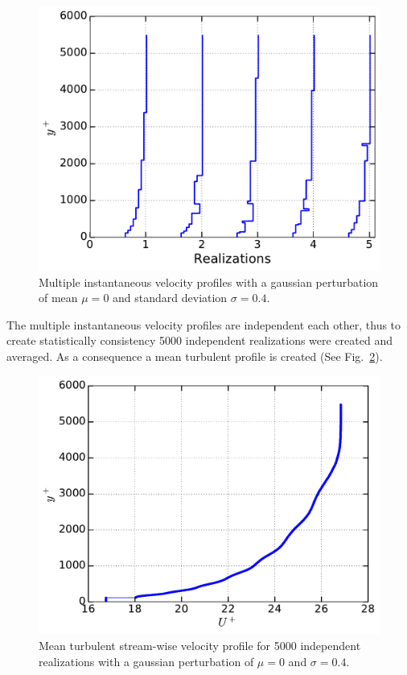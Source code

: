 \documentclass[aps,reprint,amsmath,amssymb,prl]{revtex4-1}%
\begin{document}
\begin{figure}[b]
\includegraphics[scale=0.46]{figures/multiple_instantaneous_vprof}
\caption{\label{fig:mul_profiles} Multiple instantaneous velocity profiles with a gaussian perturbation of mean $\mu=0$ and standard deviation $\sigma=0.4$.}
\end{figure}
The multiple instantaneous velocity profiles are independent each other, thus to create statistically consistency 5000 independent realizations were created and averaged. As a consequence a mean turbulent profile is created (See Fig.~\ref{fig:mean_profile}).
\begin{figure}[b]
\includegraphics[scale=0.46]{figures/Master_averaged_step_profile_5000_assembles}
\caption{\label{fig:mean_profile} Mean turbulent stream-wise velocity profile for 5000 independent realizations with a gaussian perturbation of $\mu=0$ and $\sigma=0.4$.}
\end{figure} 


\end{document}

